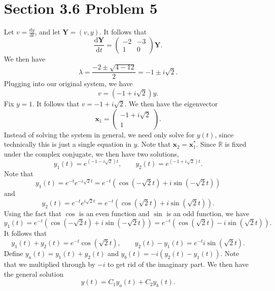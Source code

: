 \documentclass[11pt, letterpaper]{report}
\begin{document}
\section*{Section 3.6 Problem 5}
Let $v=\frac{\mathrm{d}y}{\mathrm{d}t} $, and let $\mathbf{Y}=(v,y)$. It follows that
\[
	\frac{\mathrm{d}\mathbf{Y}}{\mathrm{d}t} = \begin{pmatrix}
		-2&-3\\
		1&0
	\end{pmatrix} \mathbf{Y}
.\]
We then have
\[
	\lambda =\frac{-2\pm \sqrt{4-12} }{2}=-1\pm i\sqrt{2} 
.\]
Plugging into our original system, we have
\[
	v=\left( -1+i\sqrt{2}  \right) y
.\]
Fix $y=1$. It follows that $v=-1+i\sqrt{2} $. We then have the eigenvector
\[
	\mathbf{x}_1=\begin{pmatrix}
		-1+i\sqrt{2}  \\
		1
	\end{pmatrix} 
.\]
Instead of solving the system in general, we need only solve for $y(t)$, since technically this is just a single equation in $y$. Note that $\mathbf{x}_2=\mathbf{x}_1^*$. Since $\mathbb{R}$ is fixed under the complex conjugate, we then have two solutions,
\[
	y_1(t)= e^{\left( -1-i\sqrt{2}  \right) t},\qquad y_2(t)=e^{\left( -1+i\sqrt{2}  \right) t} 
.\]
Note that
\[
	y_1(t)=e^{-t}e^{-i\sqrt{2} t}=e^{-t}\left( \cos (-\sqrt{2} t)+i\sin \left(- \sqrt{2} t \right)  \right)
\]
and
\[
	y_2(t)=e^{-t}e^{i\sqrt{2} t}=e^{-t}\left( \cos \left( \sqrt{2} t \right) +i\sin \left( \sqrt{2} t \right)  \right) 
.\]
Using the fact that $\cos $ is an even function and $\sin $ is an odd function, we have
\[
	y_1(t)=e^{-t}\left( \cos \left( -\sqrt{2} t \right) +i\sin \left( -\sqrt{2} t \right)  \right) =e^{-t}\left( \cos \left( \sqrt{2} t \right) -i\sin \left( \sqrt{2} t \right)  \right) 
.\]
It follows that
\[
	y_1(t)+y_2(t)=e^{-t}\cos \left( \sqrt{2} t \right) ,\qquad y_2(t)-y_1(t)=e^{-t}i\sin \left( \sqrt{2} t \right) 
.\]
Define $y_a(t)=y_1(t)+y_2(t)$ and $y_b(t)=-i\left( y_2(t)-y_1(t) \right) $. Note that we multiplied through by $-i$ to get rid of the imaginary part. We then have the general solution
\[
	y(t)=C_1y_a(t)+C_2y_b(t)
.\]
\end{document}
